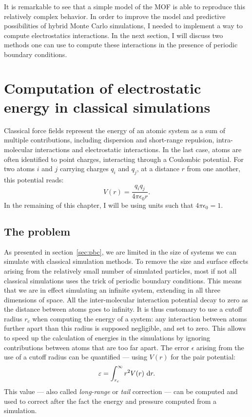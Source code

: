 \documentclass[thesis]{subfiles}
\begin{document}
It is remarkable to see that a simple model of the MOF is able to reproduce this
relatively complex behavior. In order to improve the model and predictive
possibilities of hybrid Monte Carlo simulations, I needed to implement a way to
compute electrostatics interactions. In the next section, I will discuss two
methods one can use to compute these interactions in the presence of periodic
boundary conditions.

\newpage
\section{Computation of electrostatic energy in classical simulations}
\label{sec:electrostatic}

Classical force fields represent the energy of an atomic system as a sum of
multiple contributions, including dispersion and short-range repulsion,
intra-molecular interactions and electrostatic interactions. In the last case,
atoms are often identified to point charges, interacting through a Coulombic
potential. For two atoms $i$ and $j$ carrying charges $q_i$ and $q_j$, at a
distance $r$ from one another, this potential reads:
\[ V(r) = \frac{q_i q_j}{4 \pi \epsilon_0 r}.\]
In the remaining of this chapter, I will be using units such that $4 \pi
\epsilon_0 = 1$.

\subsection{The problem}

As presented in section~\ref{sec:pbc}, we are limited in the size of systems we
can simulate with classical simulation methods. To remove the size and surface
effects arising from the relatively small number of simulated particles, most if
not all classical simulations uses the trick of periodic boundary conditions.
This means that we are in effect simulating an infinite system, extending in all
three dimensions of space. All the inter-molecular interaction potential decay
to zero as the distance between atoms goes to infinity. It is thus customary to
use a cutoff radius $r_c$ when computing the energy of a system: any interaction
between atoms further apart than this radius is supposed negligible, and set to
zero. This allows to speed up the calculation of energies in the simulations by
ignoring contributions between atoms that are too far apart. The error
$\epsilon$ arising from the use of a cutoff radius can be quantified --- using
$V(r)$ for the pair potential:
\[\varepsilon = \int_{r_c}^\infty r^2 V(r)\ \text{d} r. \]
This value --- also called \emph{long-range} or \emph{tail} correction --- can
be computed and used to correct after the fact the energy and pressure computed
from a simulation.
\end{document}
